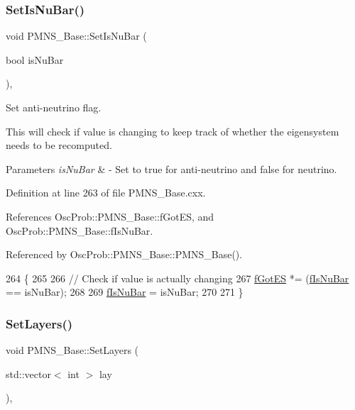 \subsubsection{\texorpdfstring{Set\+Is\+Nu\+Bar()}{SetIsNuBar()}}
{\footnotesize\ttfamily void P\+M\+N\+S\+\_\+\+Base\+::\+Set\+Is\+Nu\+Bar (\begin{DoxyParamCaption}\item[{bool}]{is\+Nu\+Bar }\end{DoxyParamCaption})\hspace{0.3cm}{\ttfamily [virtual]}, {\ttfamily [inherited]}}

Set anti-\/neutrino flag.

This will check if value is changing to keep track of whether the eigensystem needs to be recomputed.


\begin{DoxyParams}{Parameters}
{\em is\+Nu\+Bar} & -\/ Set to true for anti-\/neutrino and false for neutrino. \\
\hline
\end{DoxyParams}


Definition at line 263 of file P\+M\+N\+S\+\_\+\+Base.\+cxx.



References Osc\+Prob\+::\+P\+M\+N\+S\+\_\+\+Base\+::f\+Got\+ES, and Osc\+Prob\+::\+P\+M\+N\+S\+\_\+\+Base\+::f\+Is\+Nu\+Bar.



Referenced by Osc\+Prob\+::\+P\+M\+N\+S\+\_\+\+Base\+::\+P\+M\+N\+S\+\_\+\+Base().


\begin{DoxyCode}
264 \{
265 
266   \textcolor{comment}{// Check if value is actually changing}
267   \hyperlink{classOscProb_1_1PMNS__Base_a6dc5cd010d2d70b2324745b4e53e9839}{fGotES} *= (\hyperlink{classOscProb_1_1PMNS__Base_a0ebaeaefab36a3ff381c6293faedfdd6}{fIsNuBar} == isNuBar);
268 
269   \hyperlink{classOscProb_1_1PMNS__Base_a0ebaeaefab36a3ff381c6293faedfdd6}{fIsNuBar} = isNuBar;
270 
271 \}
\end{DoxyCode}
\mbox{\label{classOscProb_1_1PMNS__Base_a904e580edf89fb98bf9a6397739b4ebe}} 
\subsubsection{\texorpdfstring{Set\+Layers()}{SetLayers()}}
{\footnotesize\ttfamily void P\+M\+N\+S\+\_\+\+Base\+::\+Set\+Layers (\begin{DoxyParamCaption}\item[{std\+::vector$<$ int $>$}]{lay }\end{DoxyParamCaption})\hspace{0.3cm}{\ttfamily [virtual]}, {\ttfamily [inherited]}}

